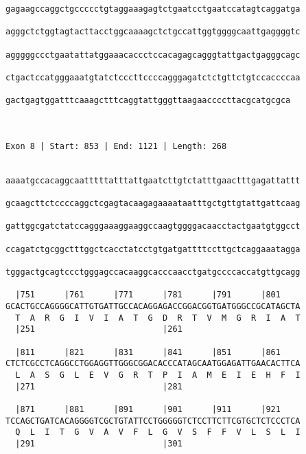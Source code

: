 \documentclass{article}
\begin{document}
\begin{Verbatim}
gagaagccaggctgccccctgtaggaaagagtctgaatcctgaatccatagtcaggatga
                                                            
agggctctggtagtacttacctggcaaaagctctgccattggtggggcaattgaggggtc
                                                            
agggggccctgaatattatggaaacaccctccacagagcagggtattgactgagggcagc
                                                            
ctgactccatgggaaatgtatctcccttccccagggagatctctgttctgtccaccccaa
                                                            
gactgagtggatttcaaagctttcaggtattgggttaagaaccccttacgcatgcgca
                                                          
                                                          
 
Exon 8 | Start: 853 | End: 1121 | Length: 268


aaaatgccacaggcaatttttatttattgaatcttgtctatttgaactttgagattattt
                                                            
gcaagcttctccccaggctcgagtacaagagaaaataatttgctgttgtattgattcaag
                                                            
gattggcgatctatccagggaaaggaaggccaagtggggacaacctactgaatgtggcct
                                                            
ccagatctgcggctttggctcacctatcctgtgatgattttccttgctcaggaaatagga
                                                            
tgggactgcagtccctgggagccacaaggcacccaacctgatgccccaccatgttgcagg
                                                            
  |751      |761      |771      |781      |791      |801    
GCACTGCCAGGGGCATTGTGATTGCCACAGGAGACCGGACGGTGATGGGCCGCATAGCTA
  T  A  R  G  I  V  I  A  T  G  D  R  T  V  M  G  R  I  A  T
  |251                          |261                        
  
  |811      |821      |831      |841      |851      |861    
CTCTCGCCTCAGGCCTGGAGGTTGGGCGGACACCCATAGCAATGGAGATTGAACACTTCA
  L  A  S  G  L  E  V  G  R  T  P  I  A  M  E  I  E  H  F  I
  |271                          |281                        
  
  |871      |881      |891      |901      |911      |921    
TCCAGCTGATCACAGGGGTCGCTGTATTCCTGGGGGTCTCCTTCTTCGTGCTCTCCCTCA
  Q  L  I  T  G  V  A  V  F  L  G  V  S  F  F  V  L  S  L  I
  |291                          |301                        
  

\end{Verbatim}
\end{document}
